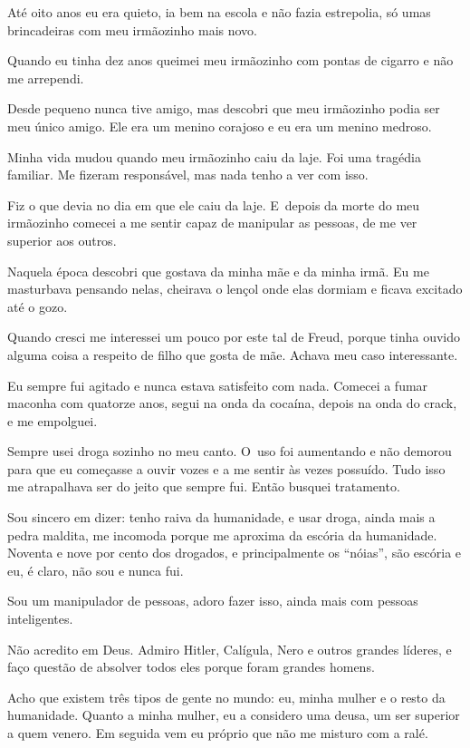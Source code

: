  

Até oito anos eu era quieto, ia bem na escola e não fazia estrepolia, só
umas brincadeiras com meu irmãozinho mais novo.

Quando eu tinha dez anos queimei meu irmãozinho com pontas de cigarro e
não me arrependi.

Desde pequeno nunca tive amigo, mas descobri que meu irmãozinho podia
ser meu único amigo. Ele era um menino corajoso e eu era um menino
medroso.

Minha vida mudou quando meu irmãozinho caiu da laje. Foi uma tragédia
familiar. Me fizeram responsável, mas nada tenho a ver com isso.

Fiz o que devia no dia em que ele caiu da laje. E~depois da morte do meu
irmãozinho comecei a me sentir capaz de manipular as pessoas, de me ver
superior aos outros.

Naquela época descobri que gostava da minha mãe e da minha irmã. Eu me
masturbava pensando nelas, cheirava o lençol onde elas dormiam e ficava
excitado até o gozo.

Quando cresci me interessei um pouco por este tal de Freud, porque tinha
ouvido alguma coisa a respeito de filho que gosta de mãe. Achava meu
caso interessante.

Eu sempre fui agitado e nunca estava satisfeito com nada. Comecei a
fumar maconha com quatorze anos, segui na onda da cocaína, depois na
onda do crack, e me empolguei.

\asterisc{}

Sempre usei droga sozinho no meu canto. O~uso foi aumentando e não
demorou para que eu começasse a ouvir vozes e a me sentir às vezes
possuído. Tudo isso me atrapalhava ser do jeito que sempre fui. Então
busquei tratamento.

Sou sincero em dizer: tenho raiva da humanidade, e usar droga, ainda
mais a pedra maldita, me incomoda porque me aproxima da escória da
humanidade. Noventa e nove por cento dos drogados, e principalmente os
``nóias'', são escória e eu, é claro, não sou e nunca fui.

Sou um manipulador de pessoas, adoro fazer isso, ainda mais com pessoas
inteligentes.

Não acredito em Deus. Admiro Hitler, Calígula, Nero e outros grandes
líderes, e faço questão de absolver todos eles porque foram grandes
homens.

Acho que existem três tipos de gente no mundo: eu, minha mulher e o
resto da humanidade. Quanto a minha mulher, eu a considero uma deusa, um
ser superior a quem venero. Em seguida vem eu próprio que não me misturo
com a ralé.

